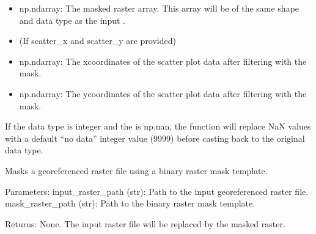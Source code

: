 \documentclass[letterpaper,10pt,english]{sphinxmanual}
\begin{document}
\begin{fulllineitems}
\begin{description}
\begin{itemize}
\end{itemize}

\begin{itemize}
\item {} 
\sphinxAtStartPar
np.ndarray: The masked raster array. This array will be of the same shape and data type as the input .

\item {} 
\sphinxAtStartPar
(If scatter\_x and scatter\_y are provided)

\item {} 
\sphinxAtStartPar
np.ndarray: The x\sphinxhyphen{}coordinates of the scatter plot data after filtering with the mask.

\item {} 
\sphinxAtStartPar
np.ndarray: The y\sphinxhyphen{}coordinates of the scatter plot data after filtering with the mask.

\end{itemize}

\sphinxAtStartPar
If the  data type is integer and the  is np.nan, the function will 
replace NaN values with a default “no data” integer value (\sphinxhyphen{}9999) before casting back to the 
original data type.

\end{description}

\end{fulllineitems}


\begin{fulllineitems}
\label{\detokenize{akhdefo_functions:akhdefo_functions.Akhdefo_GOI.mask_raster_with_template}}
\pysigstartsignatures
{}
\pysigstopsignatures
\sphinxAtStartPar
Masks a georeferenced raster file using a binary raster mask template.

\sphinxAtStartPar
Parameters:
\sphinxhyphen{} input\_raster\_path (str): Path to the input georeferenced raster file.
\sphinxhyphen{} mask\_raster\_path (str): Path to the binary raster mask template.

\sphinxAtStartPar
Returns:
None. The input raster file will be replaced by the masked raster.

\end{fulllineitems}
\end{document}
